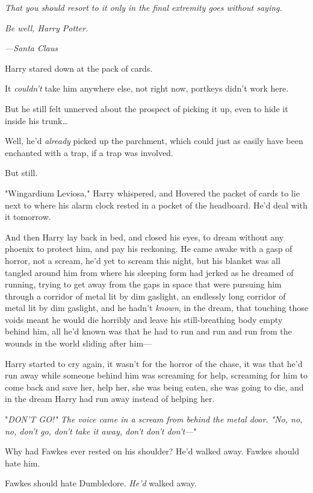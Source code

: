 \emph{That you should resort to it only in the final extremity goes without 
saying.}

\emph{Be well, Harry Potter.}

\emph{---Santa Claus}

Harry stared down at the pack of cards.

It \emph{couldn't} take him anywhere else, not right now, portkeys didn't work 
here.

But he still felt unnerved about the prospect of picking it up, even to hide it 
inside his trunk{\ldots}

Well, he'd \emph{already} picked up the parchment, which could just as easily 
have been enchanted with a trap, if a trap was involved.

But still.

"Wingardium Leviosa," Harry whispered, and Hovered the packet of cards to lie 
next to where his alarm clock rested in a pocket of the headboard. He'd deal 
with it tomorrow.

And then Harry lay back in bed, and closed his eyes, to dream without any 
phoenix to protect him, and pay his reckoning.
\sbreak
He came awake with a gasp of horror, not a scream, he'd yet to scream this 
night, but his blanket was all tangled around him from where his sleeping form 
had jerked as he dreamed of running, trying to get away from the gaps in space 
that were pursuing him through a corridor of metal lit by dim gaslight, an 
endlessly long corridor of metal lit by dim gaslight, and he hadn't 
\emph{known}, in the dream, that touching those voids meant he would die 
horribly and leave his still-breathing body empty behind him, all he'd known 
was that he had to run and run and run from the wounds in the world sliding 
after him---

Harry started to cry again, it wasn't for the horror of the chase, it was that 
he'd run away while someone behind him was screaming for help, screaming for 
him to come back and save her, help her, she was being eaten, she was going to 
die, and in the dream Harry had run away instead of helping her.

"\emph{DON'T GO!" The voice came in a scream from behind the metal door. "No, 
no, no, don't go, don't take it away, don't don't don't---}"

Why had Fawkes ever rested on his shoulder? He'd walked away. Fawkes should 
hate him.

Fawkes should hate Dumbledore. \emph{He'd} walked away.


